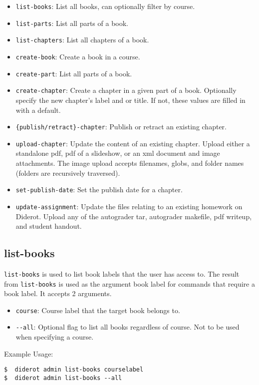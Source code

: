 \begin{itemize}
  \item \verb|list-books|: List all books, can optionally filter by course.
  \item \verb|list-parts|: List all parts of a book.
  \item \verb|list-chapters|: List all chapters of a book.
  \item \verb|create-book|: Create a book in a course.
  \item \verb|create-part|: List all parts of a book.
  \item \verb|create-chapter|: Create a chapter in a given part of a
    book. Optionally specify the new chapter's label and or title. If
    not, these values are filled in with a default.
  \item \verb|{publish/retract}-chapter|: Publish or retract an existing chapter.
  \item \verb|upload-chapter|: Update the content of an existing
    chapter. Upload either a standalone pdf, pdf of a slideshow, or an
    xml document and image attachments.  The image upload accepts
    filenames, globs, and folder names (folders are recursively
    traversed).
  \item \verb|set-publish-date|: Set the publish date for a chapter.
  \item \verb|update-assignment|: Update the files relating to an existing homework on Diderot.  Upload any of the autograder tar, autograder makefile, pdf writeup, and student handout.
\end{itemize}

\subsection{list-books}

\verb|list-books| is used to list book labels that the user has access to.
%
The result from \verb|list-books| is used as the argument book label for commands
that require a book label.
%
It accepts 2 arguments.

\begin{itemize}
  \item \verb|course|: Course label that the target book belongs to.
  \item \verb|--all|: Optional flag to list all books regardless of course. Not to be used when specifying a course.
\end{itemize}

Example Usage:
\begin{verbatim}
$  diderot admin list-books courselabel
$  diderot admin list-books --all
\end{verbatim}

